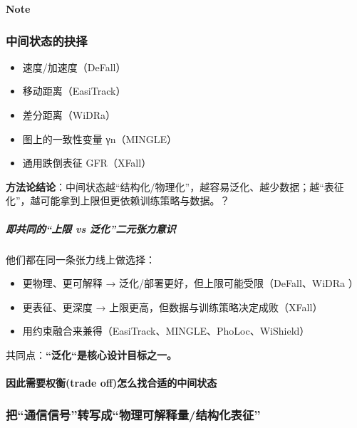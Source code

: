 \documentclass[
]{article}
\begin{document}
\textbf{Note}\\

\subsubsection{中间状态的抉择}\label{ux4e2dux95f4ux72b6ux6001ux7684ux6289ux62e9}

\begin{itemize}
\item
  速度/加速度（DeFall）
\item
  移动距离（EasiTrack）
\item
  差分距离（WiDRa）
\item
  图上的一致性变量 γn（MINGLE）
\item
  通用跌倒表征 GFR（XFall）
\end{itemize}

\textbf{方法论结论}：中间状态越``结构化/物理化''，越容易泛化、越少数据；越``表征化''，越可能拿到上限但更依赖训练策略与数据。？

\subparagraph{即共同的``上限 vs
泛化''二元张力意识}\label{ux5373ux5171ux540cux7684ux4e0aux9650-vs-ux6cdbux5316ux4e8cux5143ux5f20ux529bux610fux8bc6}

他们都在同一条张力线上做选择：

\begin{itemize}
\item
  更物理、更可解释 → 泛化/部署更好，但上限可能受限（DeFall、WiDRa ）
\item
  更表征、更深度 → 上限更高，但数据与训练策略决定成败（XFall）
\item
  用约束融合来兼得（EasiTrack、MINGLE、PhoLoc、WiShield）
\end{itemize}

共同点：\textbf{``泛化``是核心设计目标之一。}

\paragraph{因此需要权衡(trade
off)怎么找合适的中间状态}\label{ux56e0ux6b64ux9700ux8981ux6743ux8861trade-offux600eux4e48ux627eux5408ux9002ux7684ux4e2dux95f4ux72b6ux6001}

\subsubsection{把``通信信号''转写成``物理可解释量/结构化表征''}\label{ux628aux901aux4fe1ux4fe1ux53f7ux8f6cux5199ux6210ux7269ux7406ux53efux89e3ux91caux91cfux7ed3ux6784ux5316ux8868ux5f81}
\end{document}
